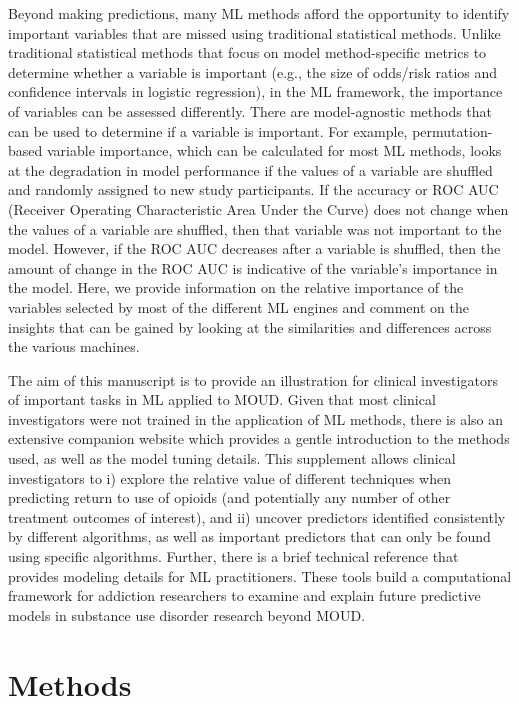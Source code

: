 \documentclass[
  number,
  preprint,
  3p,
  onecolumn]{elsarticle}
\begin{document}
Beyond making predictions, many ML methods afford the opportunity to
identify important variables that are missed using traditional
statistical methods. Unlike traditional statistical methods that focus
on model method-specific metrics to determine whether a variable is
important (e.g., the size of odds/risk ratios and confidence intervals
in logistic regression), in the ML framework, the importance of
variables can be assessed differently. There are model-agnostic methods
that can be used to determine if a variable is important. For example,
permutation-based variable importance, which can be calculated for most
ML methods, looks at the degradation in model performance if the values
of a variable are shuffled and randomly assigned to new study
participants. If the accuracy or ROC AUC (Receiver Operating
Characteristic Area Under the Curve) does not change when the values of
a variable are shuffled, then that variable was not important to the
model. However, if the ROC AUC decreases after a variable is shuffled,
then the amount of change in the ROC AUC is indicative of the variable's
importance in the model. Here, we provide information on the relative
importance of the variables selected by most of the different ML engines
and comment on the insights that can be gained by looking at the
similarities and differences across the various machines.

The aim of this manuscript is to provide an illustration for clinical
investigators of important tasks in ML applied to MOUD. Given that most
clinical investigators were not trained in the application of ML
methods, there is also an extensive companion website
\citep{balise_supplement_2025} which provides a gentle introduction to
the methods used, as well as the model tuning details. This supplement
allows clinical investigators to i) explore the relative value of
different techniques when predicting return to use of opioids (and
potentially any number of other treatment outcomes of interest), and ii)
uncover predictors identified consistently by different algorithms, as
well as important predictors that can only be found using specific
algorithms. Further, there is a brief technical reference
\citep{balise_technical_2025} that provides modeling details for ML
practitioners. These tools build a computational framework for addiction
researchers to examine and explain future predictive models in substance
use disorder research beyond MOUD.

\section{Methods}\label{methods-1}
\end{document}
